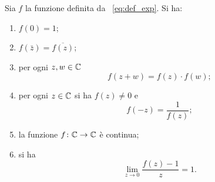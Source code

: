 \begin{theorem}
\label{th:exp_complesso}%
Sia $f$ la funzione definita da ~\eqref{eq:def_exp}.
Si ha:
\begin{enumerate}
\item
$\displaystyle f(0) = 1$;

\item
$\displaystyle f(\bar z) = \overline{f(z)}$;

\item
per ogni $z,w \in {\mathbb C}$
\[
  f(z+w) = f(z) \cdot f(w);
\]

\item
per ogni $z\in {\mathbb C}$ si ha $f(z) \neq 0$ e
\[
 f(-z) = \frac{1}{f(z)};
\]

\item la funzione $f\colon {\mathbb C} \to {\mathbb C}$ è continua;

\item si ha
\begin{equation}\label{eq:limite_exp_complesso}
   \lim_{z\to 0}\frac{f(z)-1}{z} = 1.
\end{equation}
\end{enumerate}
\end{theorem}
%
